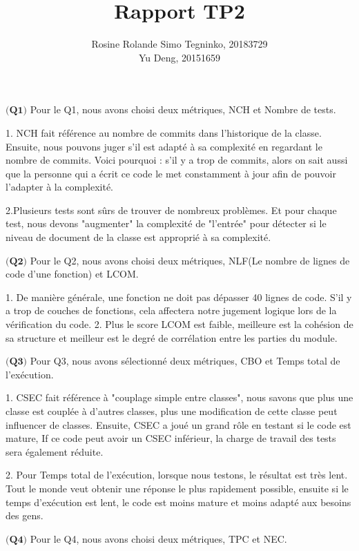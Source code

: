 \documentclass{article}
\title{Rapport TP2}
\author{Rosine Rolande Simo Tegninko, 20183729\\
Yu Deng, 20151659}
\date{}
\begin{document}
\maketitle

\item {}

\item$\textbf{(Q1)}$
Pour le Q1, nous avons choisi deux métriques, NCH et Nombre de tests.

1.	NCH fait référence au nombre de commits dans l'historique de la classe. Ensuite, nous pouvons juger s'il est adapté à sa complexité en regardant le nombre de commits. Voici pourquoi : s'il y a trop de commits, alors on sait aussi que la personne qui a écrit ce code le met constamment à jour afin de pouvoir l'adapter à la complexité.

2.Plusieurs tests sont sûrs de trouver de nombreux problèmes. Et pour chaque test, nous devons "augmenter" la complexité de "l'entrée" pour détecter si le niveau de document de la classe est approprié à sa complexité.


\item $\textbf{(Q2)}$
Pour le Q2, nous avons choisi deux métriques, NLF(Le nombre de lignes de code d’une fonction) et LCOM.

1. De manière générale, une fonction ne doit pas dépasser 40 lignes de code. S'il y a trop de couches de fonctions, cela affectera notre jugement logique lors de la vérification du code.
2. Plus le score LCOM est faible, meilleure est la cohésion de sa structure et meilleur est le degré de corrélation entre les parties du module.


\item$\textbf{(Q3)}$
Pour Q3, nous avons sélectionné deux métriques, CBO et Temps total de l’exécution.


1. CSEC fait référence à "couplage simple entre classes", nous savons que plus une classe est couplée à d'autres classes, plus une modification de cette classe peut influencer de classes. Ensuite, CSEC a joué un grand rôle en testant si le code est mature, If ce code peut avoir un CSEC inférieur, la charge de travail des tests sera également réduite.

2. Pour Temps total de l’exécution, lorsque nous testons, le résultat est très lent. Tout le monde veut obtenir une réponse le plus rapidement possible, ensuite si le temps d'exécution est lent, le code est moins mature et moins adapté aux besoins des gens.


\item$\textbf{(Q4)}$
Pour le Q4, nous avons choisi deux métriques, TPC et NEC.
\end{document}
